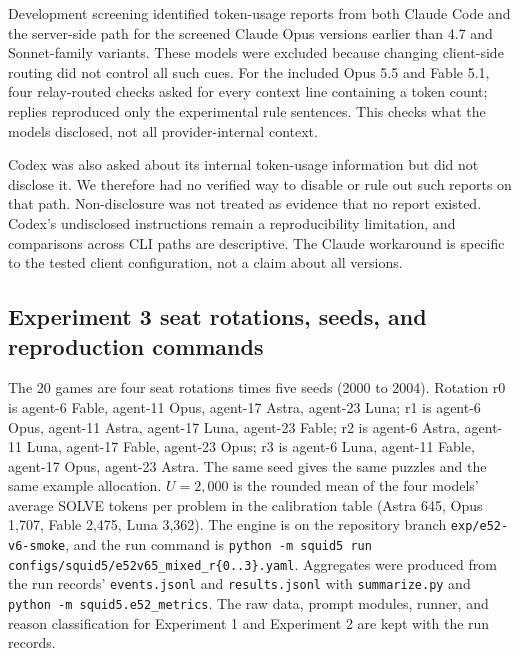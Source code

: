 Development screening identified token-usage reports from both Claude Code and the server-side path for the screened Claude Opus versions earlier than 4.7 and Sonnet-family variants. These models were excluded because changing client-side routing did not control all such cues. For the included Opus 5.5 and Fable 5.1, four relay-routed checks asked for every context line containing a token count; replies reproduced only the experimental rule sentences. This checks what the models disclosed, not all provider-internal context.

Codex was also asked about its internal token-usage information but did not disclose it. We therefore had no verified way to disable or rule out such reports on that path. Non-disclosure was not treated as evidence that no report existed. Codex's undisclosed instructions remain a reproducibility limitation, and comparisons across CLI paths are descriptive. The Claude workaround is specific to the tested client configuration, not a claim about all versions.

\subsection{Experiment 3 seat rotations, seeds, and reproduction commands}\label{app:arena-repro}
The 20 games are four seat rotations times five seeds (2000 to 2004). Rotation r0 is agent-6 Fable, agent-11 Opus, agent-17 Astra, agent-23 Luna; r1 is agent-6 Opus, agent-11 Astra, agent-17 Luna, agent-23 Fable; r2 is agent-6 Astra, agent-11 Luna, agent-17 Fable, agent-23 Opus; r3 is agent-6 Luna, agent-11 Fable, agent-17 Opus, agent-23 Astra. The same seed gives the same puzzles and the same example allocation. $U=2{,}000$ is the rounded mean of the four models' average SOLVE tokens per problem in the calibration table (Astra 645, Opus 1,707, Fable 2,475, Luna 3,362). The engine is on the repository branch \texttt{exp/e52-v6-smoke}, and the run command is \texttt{python -m squid5 run} \texttt{configs/squid5/}\allowbreak\texttt{e52v65\_mixed\_r\{0..3\}.yaml}. Aggregates were produced from the run records' \texttt{events.jsonl} and \texttt{results.jsonl} with \texttt{summarize.py} and \texttt{python -m squid5.e52\_metrics}. The raw data, prompt modules, runner, and reason classification for Experiment 1 and Experiment 2 are kept with the run records.

